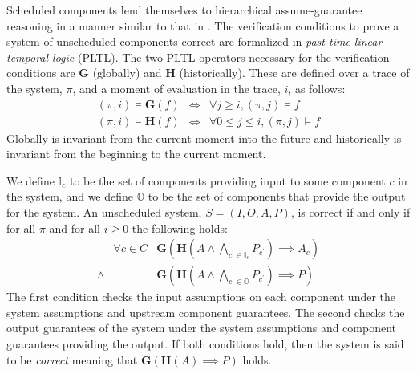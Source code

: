 
\newcommand{\globally}{\ensuremath{\mathbf{G}}}
\newcommand{\historically}{\ensuremath{\mathbf{H}}}
\newcommand{\assumes}{\ensuremath{A}}
\newcommand{\guarantees}{\ensuremath{P}}
\newcommand{\dispatch}{\ensuremath{\mathit{dispatch}}}
\newcommand{\complete}{\ensuremath{\mathit{complete}}}
\newcommand{\same}[1]{\ensuremath{\mathit{same}(#1)}}
\newcommand{\inputs}{\ensuremath{I}}
\newcommand{\outputs}{\ensuremath{O}}
\newcommand{\system}{\ensuremath{S}}
\newcommand{\components}{\ensuremath{C}}
\newcommand{\schedule}{\ensuremath{\phi}}
\newcommand{\valid}{\ensuremath{\mathit{valid}}}
\newcommand{\dpred}{\ensuremath{\delta^\phi}}
\newcommand{\dispred}{\ensuremath{\mathbb{D}^\phi}}
\newcommand{\compred}{\ensuremath{\mathbb{C}^\phi}}

Scheduled components lend themselves to hierarchical assume-guarantee reasoning in a manner similar to that in \cite{AGREE2}.
The verification conditions to prove a system of unscheduled components correct are formalized in \emph{past-time linear temporal logic} (PLTL). 
The two PLTL operators necessary for the verification conditions are $\globally$ (globally) and $\historically$ (historically).
These are defined over a trace of the system, $\pi$, and a moment of evaluation in the trace, $i$, as follows:
\begin{eqnarray*}
 (\pi, i) \models \globally(f) & \iff & \forall j \ge i, (\pi, j) \models f \\
(\pi, i) \models \historically(f) & \iff & \forall 0 \le j \le i, (\pi, j) \models f
\end{eqnarray*}
Globally is invariant from the current moment into the future and historically is invariant from the beginning to the current moment.

We define $\mathbb{I}_c$ to be the set of components providing input to some component $c$ in the system, and we define $\mathbb{O}$ to be the set of components that provide the output for the system. An unscheduled system, $\system = (\inputs, \outputs, \assumes, \guarantees)$, is correct if and only if for all $\pi$ and for all $i \ge 0$ the following holds:
\[
\begin{array}{lll}
        & \forall c \in \components &  
            \globally(\historically(\assumes \wedge 
            \bigwedge_{c^\prime \in \mathbb{I}_c} P_{c^\prime}) 
            \implies \assumes_c) \\
 \wedge &   & 
            \globally(\historically(\assumes \wedge 
            \bigwedge_{c^\prime \in \mathbb{O}} \guarantees_{c^\prime}) 
            \implies \guarantees)
\end{array}
\]
The first condition checks the input assumptions on each component under the system assumptions and upstream component guarantees. The second checks the output guarantees of the system under the system assumptions and component guarantees providing the output.  If both conditions hold, then the system is said to be \emph{correct} meaning that $\globally(\historically(\assumes) \implies \guarantees)$ holds.


